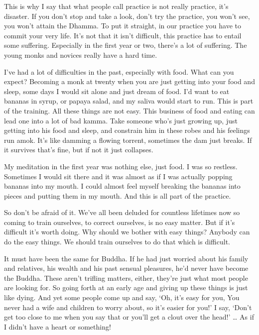 This is why I say that what people call practice is not really practice, it's disaster. If you don't stop and take a look, don't try the practice, you won't see, you won't attain the Dhamma. To put it straight, in our practice you have to commit your very life. It's not that it isn't difficult, this practice has to entail some suffering. Especially in the first year or two, there's a lot of suffering. The young monks and novices really have a hard time. 

I've had a lot of difficulties in the past, especially with food. What can you expect? Becoming a monk at twenty when you are just getting into your food and sleep, some days I would sit alone and just dream of food. I'd want to eat bananas in syrup, or papaya salad, and my saliva would start to run. This is part of the training. All these things are not easy. This business of food and eating can lead one into a lot of bad kamma. Take someone who's just growing up, just getting into his food and sleep, and constrain him in these robes and his feelings run amok. It's like damming a flowing torrent, sometimes the dam just breaks. If it survives that's fine, but if not it just collapses. 

My meditation in the first year was nothing else, just food. I was so restless. Sometimes I would sit there and it was almost as if I was actually popping bananas into my mouth. I could almost feel myself breaking the bananas into pieces and putting them in my mouth. And this is all part of the practice. 

So don't be afraid of it. We've all been deluded for countless lifetimes now so coming to train ourselves, to correct ourselves, is no easy matter. But if it's difficult it's worth doing. Why should we bother with easy things? Anybody can do the easy things. We should train ourselves to do that which is difficult. 

It must have been the same for Buddha. If he had just worried about his family and relatives, his wealth and his past sensual pleasures, he'd never have become the Buddha. These aren't trifling matters, either, they're just what most people are looking for. So going forth at an early age and giving up these things is just like dying. And yet some people come up and say, `Oh, it's easy for you,  You never had a wife and children to worry about, so it's easier for you!' I say, `Don't get too close to me when you say that or you'll get a clout over the head!' \ldots{} As if I didn't have a heart or something! 

